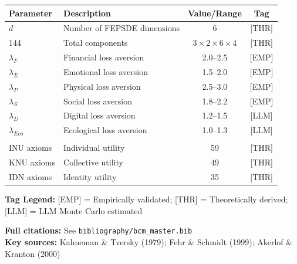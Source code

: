 \begin{tcolorbox}[colback=blue!5!white, colframe=blue!75!black,
    title=\textbf{Epistemic Status: Key Parameters}]

\renewcommand{\arraystretch}{1.3}
\begin{tabular}{@{}llcc@{}}
\toprule
\textbf{Parameter} & \textbf{Description} & \textbf{Value/Range} & \textbf{Tag} \\
\midrule
$d$ & Number of FEPSDE dimensions & 6 & [THR] \\
144 & Total components & $3 \times 2 \times 6 \times 4$ & [THR] \\
$\lambda_F$ & Financial loss aversion & 2.0--2.5 & [EMP] \\
$\lambda_E$ & Emotional loss aversion & 1.5--2.0 & [EMP] \\
$\lambda_P$ & Physical loss aversion & 2.5--3.0 & [EMP] \\
$\lambda_S$ & Social loss aversion & 1.8--2.2 & [EMP] \\
$\lambda_D$ & Digital loss aversion & 1.2--1.5 & [LLM] \\
$\lambda_{Eco}$ & Ecological loss aversion & 1.0--1.3 & [LLM] \\
\addlinespace
\multicolumn{4}{@{}l}{\textit{Axiom counts:}} \\
INU axioms & Individual utility & 59 & [THR] \\
KNU axioms & Collective utility & 49 & [THR] \\
IDN axioms & Identity utility & 35 & [THR] \\
\bottomrule
\end{tabular}

\vspace{0.5em}
\textbf{Tag Legend:} [EMP] = Empirically validated; [THR] = Theoretically derived;
[LLM] = LLM Monte Carlo estimated

\end{tcolorbox}

\noindent\textbf{Full citations:} See \texttt{bibliography/bcm\_master.bib} \\
\textbf{Key sources:} Kahneman \& Tversky (1979); Fehr \& Schmidt (1999); Akerlof \& Kranton (2000)

\vspace{1em}


